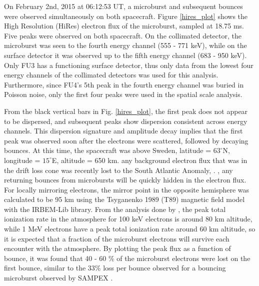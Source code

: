 \documentclass[draft, linenumbers]{agujournal}
\begin{document}
On February 2nd, 2015 at 06:12:53 UT, a microburst and subsequent bounces were observed simultaneously on both spacecraft. Figure \ref{hires_plot} shows the High Resolution (HiRes) electron flux of the microburst, sampled at 18.75 ms. Five peaks were observed on both spacecraft. On the collimated detector, the microburst was seen  to the fourth energy channel (555 - 771 keV), while on the surface detector it was observed up to the fifth energy channel (683 - 950 keV). Only FU3 has a functioning surface detector, thus only data from the lowest four energy channels of the collimated detectors was used for this analysis. Furthermore, since FU4's 5th peak in the fourth energy channel was buried in Poisson noise, only the first four peaks were used in the spatial scale analysis.

From the black vertical  bars in Fig. \ref{hires_plot}, the first peak does not appear to be dispersed, and subsequent peaks show dispersion consistent across energy channels. This dispersion signature and amplitude decay implies that the first peak was observed soon after the electrons were scattered, followed by decaying bounces. At this time, the spacecraft was above Sweden, latitude = $63^{\circ}$N, longitude = $15^{\circ}$E, altitude = 650 km.  any background electron flux that was in the drift loss cone was recently lost to the South Atlantic Anomaly, . , any returning bounces from microbursts will be quickly hidden in the  electron flux. For locally mirroring electrons, the mirror point in the opposite hemisphere was calculated to be 95 km using the Tsyganenko 1989 (T89) magnetic field model \citep{Tsyganenko1989} with the IRBEM-Lib library. From the analysis done by \citet{Fang2010}, the peak  total ionization rate in the atmosphere for 100 keV electrons is around 80 km altitude, while 1 MeV electrons have a peak total ionization rate around 60 km altitude, so it is expected that a fraction of the microburst electrons will survive each encounter with the atmosphere. By plotting the peak flux as a function of bounce, it was found that 40 - 60 \% of the microburst electrons were lost on the first bounce, similar to the 33\% loss per bounce observed for a bouncing microburst observed by SAMPEX \citep{Thorne2005}. 
\end{document}

